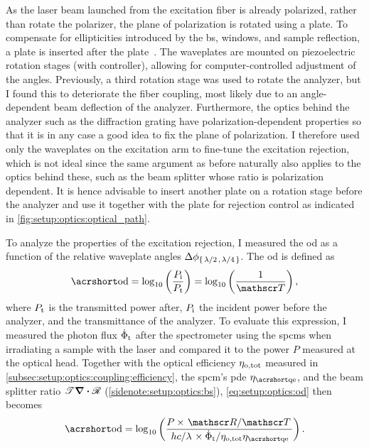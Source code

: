 As the laser beam launched from the excitation fiber is already polarized, rather than rotate the polarizer, the plane of polarization is rotated using a \halfwave plate.
To compensate for ellipticities introduced by the \gls{bs}, windows, and sample reflection, a \quarterwave plate is inserted after the \halfwave plate~\cite{Kuhlmann2013}.
The waveplates are mounted on piezoelectric rotation stages (\rotator with \rotatorcontroller controller), allowing for computer-controlled adjustment of the angles.
Previously, a third rotation stage was used to rotate the analyzer, but I found this to deteriorate the fiber coupling, most likely due to an angle-dependent beam deflection of the analyzer.
Furthermore, the optics behind the analyzer such as the diffraction grating have polarization-dependent properties so that it is in any case a good idea to fix the plane of polarization.
I therefore used only the waveplates on the excitation arm to fine-tune the excitation rejection, which is not ideal since the same argument as before naturally also applies to the optics behind these, such as the beam splitter whose ratio is polarization dependent.
It is hence advisable to insert another \halfwave plate on a rotation stage before the analyzer and use it together with the \quarterwave plate for rejection control as indicated in \cref{fig:setup:optics:optical_path}.

To analyze the properties of the excitation rejection, I measured the \gls{od} as a function of the relative waveplate angles $\Delta\phi_{\lbrace\halfwave,\quarterwave\rbrace}$.
The \gls{od} is defined as
\begin{equation}\label{eq:setup:optics:od}
    \OD = \log_{10}\left(\frac{P_{\mr{i}}}{P_{\mr{t}}}\right) = \log_{10}\left(\frac{1}{\transmittance}\right),
\end{equation}
where $P_{\mathrm{t}}$ is the transmitted power after, $P_{\mathrm{i}}$ the incident power before the analyzer, and \transmittance the transmittance of the analyzer.
To evaluate this expression, I measured the photon flux $\dot{\Phi}_{\mathrm{t}}$ after the spectrometer using the \glspl{spcm} when irradiating a sample with the laser and compared it to the power $P$ measured at the optical head.
Together with the optical efficiency $\eta_{\mathrm{o,tot}}$ measured in \cref{subsec:setup:optics:coupling:efficiency}, the \gls{spcm}'s \gls{pde} $\eta_{\QE}$, and the beam splitter ratio $\mathscr{T}\div\mathscr{R}$ (\cf \cref{sidenote:setup:optics:bs}), \cref{eq:setup:optics:od} then becomes
\begin{equation}\label{eq:setup:optics:od:eval}
    \OD = \log_{10}\left(\frac{P\times\flatfrac{\reflectance}{\transmittance}}{\flatfrac{hc}{\lambda}\times\dot{\Phi}_{\mr{t}}/\eta_{\mr{o,tot}}\eta_{\QE}}\right).
\end{equation}

